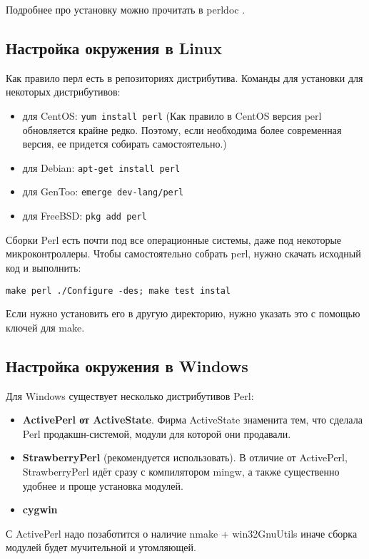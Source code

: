 Подробнее про установку можно прочитать в perldoc .

\subsection{Настройка окружения в Linux}
Как правило перл есть в репозиториях дистрибутива. Команды для установки для некоторых дистрибутивов:
\begin{itemize}
 \item для CentOS: \verb|yum install perl| (Как правило в CentOS версия perl обновляется крайне редко. Поэтому, если необходима более современная версия, ее придется собирать самостоятельно.)
 \item для Debian: \verb|apt-get install perl|
 \item для GenToo: \verb|emerge dev-lang/perl|
 \item для FreeBSD: \verb|pkg add perl|
\end{itemize}
Сборки Perl есть почти под все операционные системы, даже под некоторые микроконтроллеры. Чтобы самостоятельно собрать perl, нужно скачать исходный код и выполнить:
\begin{verbatim}
make perl ./Configure -des; make test instal
\end{verbatim}
Если нужно установить его в другую директорию, нужно указать это с помощью ключей для make.

\subsection{Настройка окружения в Windows}
Для Windows существует несколько дистрибутивов Perl:
\begin{itemize}
  \item \textbf{ActivePerl от ActiveState}. Фирма ActiveState знаменита тем, что сделала Perl продакшн-системой, модули для которой они продавали.
  \item \textbf{StrawberryPerl} (рекомендуется использовать). В отличие от ActivePerl, StrawberryPerl идёт сразу с компилятором mingw, а также существенно удобнее и проще установка модулей.
  \item \textbf{cygwin}
\end{itemize}
С ActivePerl надо позаботится о наличие nmake + win32GnuUtils иначе сборка модулей будет мучительной и утомляющей.


